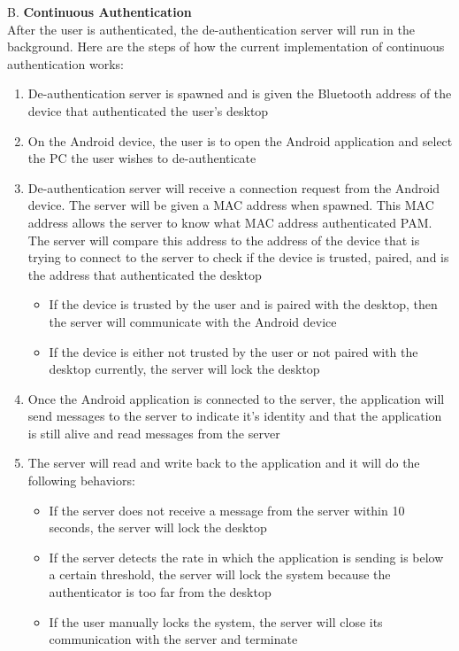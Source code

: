 \documentclass[letterpaper,twocolumn,10pt]{article}
\begin{document}
B. \textbf{Continuous Authentication}\\
After the user is authenticated, the de-authentication server will run in the background. Here are the steps of how the current implementation of continuous authentication works:
\begin{enumerate}[noitemsep]
\item De-authentication server is spawned and is given the Bluetooth address of the device that authenticated the user's desktop
\item On the Android device, the user is to open the Android application and select the PC the user wishes to de-authenticate
\item De-authentication server will receive a connection request from the Android device. The server will be given a MAC address when spawned. This MAC address allows the server to know what MAC address authenticated PAM. The server will compare this address to the address of the device that is trying to connect to the server to check if the device is trusted, paired, and is the address that authenticated the desktop
\begin{itemize}
\item If the device is trusted by the user and is paired with the desktop, then the server will communicate with the Android device
\item If the device is either not trusted by the user or not paired with the desktop currently, the server will lock the desktop
\end{itemize}
\item Once the Android application is connected to the server, the application will send messages to the server to indicate it's identity and that the application is still alive and read messages from the server
\item The server will read and write back to the application and it will do the following behaviors:
\begin{itemize}
\item If the server does not receive a message from the server within 10 seconds, the server will lock the desktop
\item If the server detects the rate in which the application is sending is below a certain threshold, the server will lock the system because the authenticator is too far from the desktop
\item If the user manually locks the system, the server will close its communication with the server and terminate
\end{itemize}
\end{enumerate}
\end{document}
